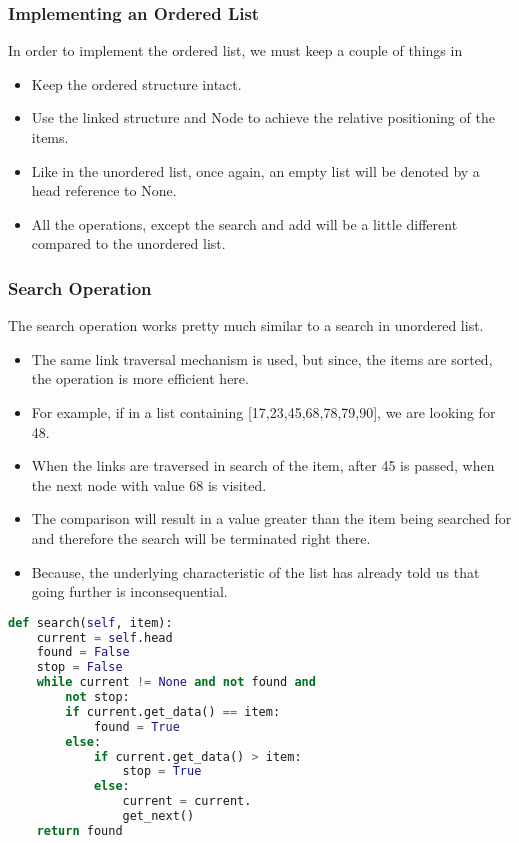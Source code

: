 \documentclass{beamer}
\begin{document}
\begin{frame}
\frametitle{Implementing an Ordered List}
In order to implement the ordered list, we must keep a couple of things in 

\begin{itemize}
\item Keep the ordered structure intact.
\item Use the linked structure and Node to achieve the relative positioning of the items.
\item Like in the unordered list, once again, an empty list will be denoted by a head reference to None.
\item All the operations, except the search and add will be a little different compared to the unordered list.
\end{itemize}
\end{frame}


\begin{frame}
\frametitle{Search Operation}

The search operation works pretty much similar to a search in unordered list.

\begin{itemize}
\item The same link traversal mechanism is used, but since, the items are sorted, the  operation is more efficient here.

\item For example, if in a list containing [17,23,45,68,78,79,90], we are looking for 48.

\item When the links are traversed in search of the item, after 45 is passed, when the next node with value 68 is visited.

\item The comparison will result in a value greater than the item being searched for and therefore the search will be terminated right there.

\item Because, the underlying characteristic of the list has already told us that going further is inconsequential. 
\end{itemize}
\end{frame}

\begin{frame}[fragile]
\begin{lstlisting}[language=Python]
def search(self, item):
	current = self.head
	found = False
	stop = False
	while current != None and not found and
	 	not stop:
		if current.get_data() == item:
			found = True
		else:
			if current.get_data() > item:
				stop = True
			else:
				current = current.
				get_next()
	return found
\end{lstlisting}
\end{frame}
\end{document}
